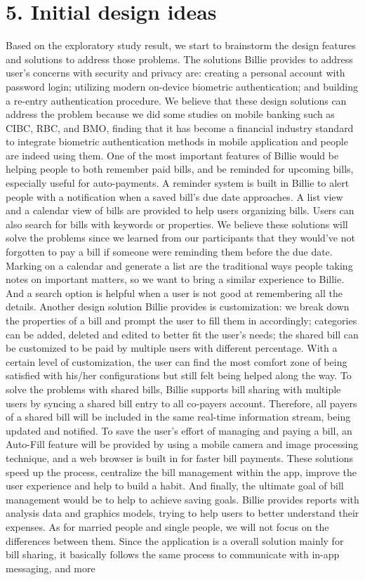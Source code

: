 \documentclass{sigchi}
\begin{document}
\section{5. Initial design ideas}

Based on the exploratory study result, we start to brainstorm the design features and solutions to address those problems. The solutions Billie provides to address user's concerns with security and privacy are: creating a personal account with password login; utilizing modern on-device biometric authentication; and building a re-entry authentication procedure. We believe that these design solutions can address the problem because we did some studies on mobile banking such as CIBC, RBC, and BMO, finding that it has become a financial industry standard to integrate biometric authentication methods in mobile application and people are indeed using them. One of the most important features of Billie would be helping people to both remember paid bills, and be reminded for upcoming bills, especially useful for auto-payments. A reminder system is built in Billie to alert people with a notification when a saved bill's due date approaches. A list view and a calendar view of bills are provided to help users organizing bills. Users can also search for bills with keywords or properties. We believe these solutions will solve the problems since we learned from our participants that they would've not forgotten to pay a bill if someone were reminding them before the due date. Marking on a calendar and generate a list are the traditional ways people taking notes on important matters, so we want to bring a similar experience to Billie. And a search option is helpful when a user is not good at remembering all the details. Another design solution Billie provides is customization: we break down the properties of a bill and prompt the user to fill them in accordingly; categories can be added, deleted and edited to better fit the user's needs; the shared bill can be customized to be paid by multiple users with different percentage. With a certain level of customization, the user can find the most comfort zone of being satisfied with his/her configurations but still felt being helped along the way. To solve the problems with shared bills, Billie supports bill sharing with multiple users by syncing a shared bill entry to all co-payers account. Therefore, all payers of a shared bill will be included in the same real-time information stream, being updated and notified. To save the user's effort of managing and paying a bill, an Auto-Fill feature will be provided by using a mobile camera and image processing technique, and a web browser is built in for faster bill payments. These solutions speed up the process, centralize the bill management within the app,  improve the user experience and help to build a habit. And finally, the ultimate goal of bill management would be to help to achieve saving goals. Billie provides reports with analysis data and graphics models, trying to help users to better understand their expenses. As for married people and single people, we will not focus on the differences between them. Since the application is a overall solution mainly for bill sharing, it basically follows the same process to communicate with in-app messaging, and more 
\end{document}
